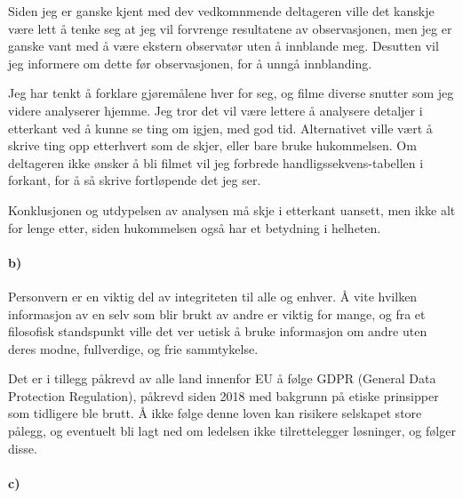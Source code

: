 \documentclass{../../myassignment}
\begin{document}
		Siden jeg er ganske kjent med dev vedkomnmende deltageren ville det kanskje v{\ae}re lett {\aa} tenke seg at jeg vil forvrenge resultatene av observasjonen, men jeg er ganske vant med {\aa} v{\ae}re ekstern observat{\o}r uten {\aa} innblande meg. Desutten vil jeg informere om dette f{\o}r observasjonen, for {\aa} unng{\aa} innblanding.

		Jeg har tenkt {\aa} forklare gj{\o}rem{\aa}lene hver for seg, og filme diverse snutter som jeg videre analyserer hjemme. Jeg tror det vil v{\ae}re lettere {\aa} analysere detaljer i etterkant ved {\aa} kunne se ting om igjen, med god tid. Alternativet ville v{\ae}rt {\aa} skrive ting opp etterhvert som de skjer, eller bare bruke hukommelsen. Om deltageren ikke {\o}nsker {\aa} bli filmet vil jeg forbrede handligssekvens-tabellen i forkant, for {\aa} s{\aa} skrive fortl{\o}pende det jeg ser. 

		Konklusjonen og utdypelsen av analysen m{\aa} skje i etterkant uansett, men ikke alt for lenge etter, siden hukommelsen ogs{\aa} har et betydning i helheten.


	\newpage

	\paragraph*{b)}

	Personvern er en viktig del av integriteten til alle og enhver. {\AA} vite hvilken informasjon av en selv som blir brukt av andre er viktig for mange, og fra et filosofisk standspunkt ville det ver uetisk {\aa} bruke informasjon om andre uten deres modne, fullverdige, og frie sammtykelse. 

	Det er i tillegg p{\aa}krevd av alle land innenfor EU {\aa} f{\o}lge GDPR (General Data Protection Regulation), p{\aa}krevd siden 2018 med bakgrunn p{\aa} etiske prinsipper som tidligere ble brutt. {\AA} ikke f{\o}lge denne loven kan risikere selskapet store p{\aa}legg, og eventuelt bli lagt ned om ledelsen ikke tilrettelegger l{\o}sninger, og f{\o}lger disse.

	\paragraph*{c)}
\end{document}
